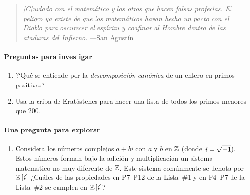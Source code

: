{\small
\begin{quote}
	\textit{
		[C]uidado con el matem\'atico y los otros que hacen falsas profec\'{\i}as.
		El peligro ya existe de que los matem\'aticos hayan hecho un pacto con el
		Diablo para oscurecer el esp\'{\i}ritu y confinar al Hombre dentro de las
		ataduras del Infierno.
	}
	\hfill ---San Agustín
\end{quote}
}
\paragraph{Preguntas para investigar}
\begin{enumerate}[label=P\arabic*]
	
	\item\label{item:factorizacion}
		?`Qu\'e se entiende por la \emph{descomposici\'on canónica}
		de un entero en primos positivos?
	\item\label{item:criba}
		Usa la criba de Erat\'ostenes para hacer una lista de todos
		los primos menores que $200$.
	\seti
\end{enumerate}
%

\paragraph{Una pregunta para explorar}
\begin{enumerate}[label=P\arabic*]
	\conti
	\item\label{item:gaussianos}
		Considera los n\'umeros complejos $a + bi$ con $a$ y $b$ en
		$\mathbb{Z}$ (donde $\mathit i = \sqrt{-1}$).
		Estos n\'umeros forman bajo la adici\'on y multiplicaci\'on
		un sistema matem\'atico no muy diferente de $\mathbb{Z}$.
		Este sistema com\'unmente se denota por ${\mathbb{Z}}\left[\mathit i\right]$
		¿Cu\'ales de las propiedades en P7--P12 de la Lista~\#1
		y en P4--P7 de la Lista~\#2 se cumplen en ${\mathbb{Z}}\left[\mathit i\right]$?
	\seti
\end{enumerate}
%

